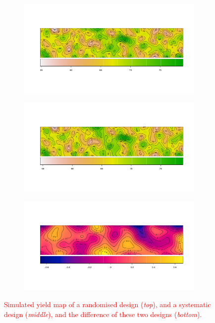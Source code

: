 \documentclass[a4paper]{article}   	%
\newcommand{\revision}[1]{\textcolor{red}{#1}}
\begin{document}
\begin{figure}[!htp]
\centering
    \begin{subfigure}[t]{0.9\textwidth}
		\centering
		\includegraphics[width=\linewidth]{quad_random_yield_mat.pdf}
    \end{subfigure}
    \begin{subfigure}[t]{0.9\textwidth}
		\centering
		\includegraphics[width=\linewidth]{quad_syst_yield_mat.pdf}
    \end{subfigure}
    \begin{subfigure}[t]{0.9\textwidth}
		\centering
		\includegraphics[width=\linewidth]{quad_diff_yield_mat.pdf}
    \end{subfigure}
	\caption{\revision{Simulated yield map of a randomised design (\textit{top}), and a systematic design (\textit{middle}), and the difference of these two designs (\textit{bottom}).}}\label{fig:yieldmap}
\end{figure}
\end{document}
